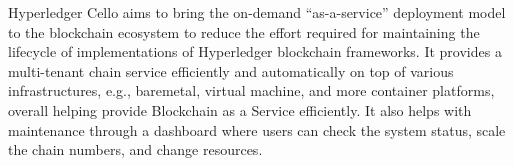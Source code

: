 Hyperledger Cello aims to bring the on-demand “as-a-service” deployment model to the blockchain ecosystem to reduce the effort required for maintaining the lifecycle of implementations of Hyperledger blockchain frameworks. It provides a multi-tenant chain service efficiently and automatically on top of various infrastructures, e.g., baremetal, virtual machine, and more container platforms, overall helping provide Blockchain as a Service efficiently. It also helps with maintenance through a dashboard where users can check the system status, scale the chain numbers, and change resources.
